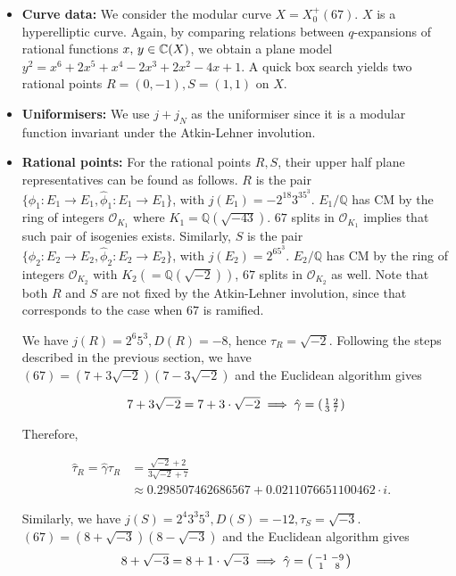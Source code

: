 \begin{itemize}

\item \textbf{Curve data:} We consider the modular curve $X = X_0^+(67)$. $X$ is a hyperelliptic curve. Again, by comparing relations between $q$-expansions of rational functions $x,\,y \in \mathbb{C}(X)$, we obtain a plane model $y^2 =  x^6 + 2x^5 + x^4 - 2x^3 + 2x^2 - 4x +1$. A quick box search yields two rational points $R = (0,-1),S = (1,1)$ on $X$.

\item \textbf{Uniformisers:} We use $j + j_N$ as the uniformiser since it is a modular function invariant under the Atkin-Lehner involution.

\item \textbf{Rational points:}  For the rational points $R,S$, their upper half plane representatives can be found as follows. $R$ is the pair $\{\phi_1: E_1 \rightarrow E_1, \hat{\phi}_1: E_1 \rightarrow E_1\}$, with $j(E_1) =   -2^{18}3^35^3$. $E_1/\mathbb{Q}$ has CM by the ring of integers $\mathcal{O}_{K_1}$ where $K_1 = \mathbb{Q}(\sqrt{-43})$. $67$ splits in $\mathcal{O}_{K_1}$ implies that such pair of isogenies exists. Similarly, $S$ is the pair $\{\phi_2: E_2 \rightarrow E_2, \hat{\phi}_2: E_2 \rightarrow E_2\}$, with $j(E_2) =2^65^3$.  $E_2/\mathbb{Q}$ has CM by the ring of integers $\mathcal{O}_{K_2}$ with $K_2 (= \mathbb{Q}(\sqrt{-2}))$, $67$ splits in $\mathcal{O}_{K_2}$ as well. Note that both $R$ and $S$ are not fixed by the Atkin-Lehner involution, since that corresponds to the case when $67$ is ramified.

We have $j(R) = 2^6 5^3, D(R) = -8$, hence $\tau_R = \sqrt{-2}$.
Following the steps described in the previous section, we have $(67) = (7+3\sqrt{-2})(7-3\sqrt{-2})$ and the Euclidean algorithm gives

\[
  7 + 3\sqrt{-2} = 7+ 3\cdot \sqrt{-2} \implies \hat{\gamma} = \begin{psmallmatrix}
    1       & 2 \\
    3       & 7
\end{psmallmatrix}
\]

Therefore, 

\begin{align*}
 \hat{\tau}_R = \hat{\gamma}\tau_R &= \frac{\sqrt{-2}+2}{3\sqrt{-2}+7} & \\ &\approx 0.298507462686567 + 0.0211076651100462\cdot i.
\end{align*}

Similarly, we have $j(S) = 2^4 3^3 5^3, D(S) = -12, \tau_S = \sqrt{-3}$. $(67) =
(8+\sqrt{-3})(8-\sqrt{-3})$ and the Euclidean algorithm gives
\[
  8 + \sqrt{-3} = 8 + 1\cdot\sqrt{-3} \implies \hat{\gamma} = \begin{psmallmatrix}
    -1       & -9 \\
    1       & 8
\end{psmallmatrix}
\]


\end{itemize}
